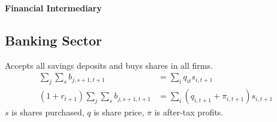 \documentclass[letterpaper,12pt]{article}
\begin{document}
\begin{center}
{\LARGE \bf Financial Intermediary}
\end{center}

\begin{spacing}{1.5}

\section{Banking Sector}

	Accepts all savings deposits and buys shares in all firms.
	\begin{align}
		\sum_j \sum_s b_{j,s+1,t+1} & = \sum_i q_{it} s_{i,t+1} \nonumber \\
		(1+r_{t+1})\sum_j \sum_s b_{j,s+1,t+1} & = \sum_i (q_{i,t+1} + \pi_{i,t+1})s_{i,t+1} \nonumber
	\end{align}
	$s$ is shares purchased, $q$ is share price, $\pi$ is after-tax profits.

\end{spacing}
\end{document}
